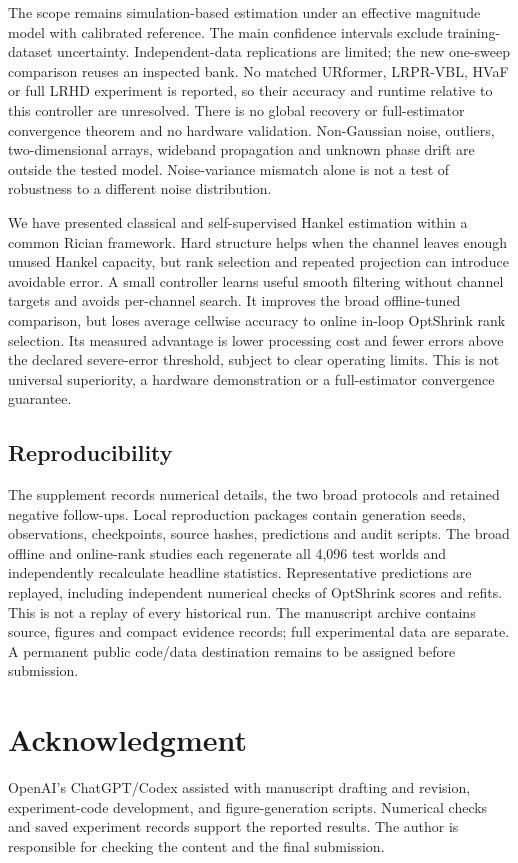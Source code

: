 \documentclass[10pt,journal,letterpaper]{IEEEtran}
\begin{document}
The scope remains simulation-based estimation under an effective magnitude model with calibrated reference. The main confidence intervals exclude training-dataset uncertainty. Independent-data replications are limited; the new one-sweep comparison reuses an inspected bank. No matched URformer, LRPR-VBL, HVaF or full LRHD experiment is reported, so their accuracy and runtime relative to this controller are unresolved. There is no global recovery or full-estimator convergence theorem and no hardware validation. Non-Gaussian noise, outliers, two-dimensional arrays, wideband propagation and unknown phase drift are outside the tested model. Noise-variance mismatch alone is not a test of robustness to a different noise distribution.

We have presented classical and self-supervised Hankel estimation within a common Rician framework. Hard structure helps when the channel leaves enough unused Hankel capacity, but rank selection and repeated projection can introduce avoidable error. A small controller learns useful smooth filtering without channel targets and avoids per-channel search. It improves the broad offline-tuned comparison, but loses average cellwise accuracy to online in-loop OptShrink rank selection. Its measured advantage is lower processing cost and fewer errors above the declared severe-error threshold, subject to clear operating limits. This is not universal superiority, a hardware demonstration or a full-estimator convergence guarantee.

\subsection{Reproducibility}
The supplement records numerical details, the two broad protocols and retained negative follow-ups. Local reproduction packages contain generation seeds, observations, checkpoints, source hashes, predictions and audit scripts. The broad offline and online-rank studies each regenerate all 4,096 test worlds and independently recalculate headline statistics. Representative predictions are replayed, including independent numerical checks of OptShrink scores and refits. This is not a replay of every historical run. The manuscript archive contains source, figures and compact evidence records; full experimental data are separate. A permanent public code/data destination remains to be assigned before submission.

\section*{Acknowledgment}
OpenAI's ChatGPT/Codex assisted with manuscript drafting and revision, experiment-code development, and figure-generation scripts. Numerical checks and saved experiment records support the reported results. The author is responsible for checking the content and the final submission.



\end{document}

